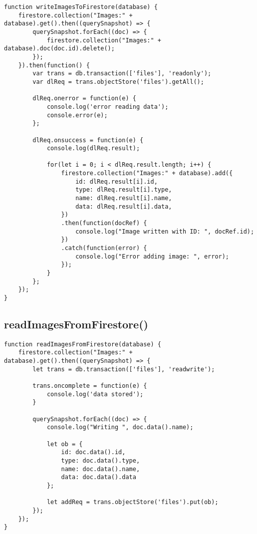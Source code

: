 \documentclass[letterpaper]{article}
\begin{document}
\begin{lstlisting}[firstnumber=1]
function writeImagesToFirestore(database) {
    firestore.collection("Images:" + database).get().then((querySnapshot) => {
        querySnapshot.forEach((doc) => {
            firestore.collection("Images:" + database).doc(doc.id).delete();
        });
    }).then(function() {
        var trans = db.transaction(['files'], 'readonly');
        var dlReq = trans.objectStore('files').getAll();

        dlReq.onerror = function(e) {
            console.log('error reading data');
            console.error(e);
        };

        dlReq.onsuccess = function(e) {
            console.log(dlReq.result);

            for(let i = 0; i < dlReq.result.length; i++) {
                firestore.collection("Images:" + database).add({
                    id: dlReq.result[i].id,
                    type: dlReq.result[i].type,
                    name: dlReq.result[i].name,
                    data: dlReq.result[i].data,
                })
                .then(function(docRef) {
                    console.log("Image written with ID: ", docRef.id);
                })
                .catch(function(error) {
                    console.log("Error adding image: ", error);
                });
            }
        };
    });
}
\end{lstlisting}

\subsection{readImagesFromFirestore()}

\begin{lstlisting}[firstnumber=36]
function readImagesFromFirestore(database) {
    firestore.collection("Images:" + database).get().then((querySnapshot) => {
        let trans = db.transaction(['files'], 'readwrite');

        trans.oncomplete = function(e) {
            console.log('data stored');
        }

        querySnapshot.forEach((doc) => {
            console.log("Writing ", doc.data().name);

            let ob = {
                id: doc.data().id,
                type: doc.data().type,
                name: doc.data().name,
                data: doc.data().data
            };

            let addReq = trans.objectStore('files').put(ob);
        });
    });
}
\end{lstlisting}
\end{document}
